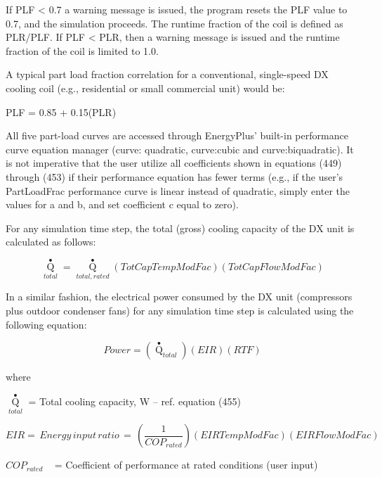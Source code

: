 If PLF \textless{} 0.7 a warning message is issued, the program resets the PLF value to 0.7, and the simulation proceeds. The runtime fraction of the coil is defined as PLR/PLF. If PLF \textless{} PLR, then a warning message is issued and the runtime fraction of the coil is limited to 1.0.

A typical part load fraction correlation for a conventional, single-speed DX cooling coil (e.g., residential or small commercial unit) would be:

PLF = 0.85 + 0.15(PLR)

All five part-load curves are accessed through EnergyPlus' built-in performance curve equation manager (curve: quadratic, curve:cubic and curve:biquadratic). It is not imperative that the user utilize all coefficients shown in equations (449) through (453) if their performance equation has fewer terms (e.g., if the user's PartLoadFrac performance curve is linear instead of quadratic, simply enter the values for a and b, and set coefficient c equal to zero).

For any simulation time step, the total (gross) cooling capacity of the DX unit is calculated as follows:

\begin{equation}
{\mathop Q\limits^ \bullet_{total}} = {\mathop Q\limits^ \bullet_{total,rated}}\left( {TotCapTempModFac} \right)\left( {TotCapFlowModFac} \right)
\end{equation}

In a similar fashion, the electrical power consumed by the DX unit (compressors plus outdoor condenser fans) for any simulation time step is calculated using the following equation:

\begin{equation}
Power = \left( {{{\mathop Q\limits^ \bullet  }_{total}}} \right)\left( {EIR} \right)\left( {RTF} \right)
\end{equation}

where

\({\mathop Q\limits^ \bullet_{total}}\) = Total cooling capacity, W -- ref. equation (455)

\begin{equation}
EIR = \,Energy\,input\,ratio\, = \,\left( {\frac{1}{{CO{P_{rated}}}}} \right)\left( {EIRTempModFac} \right)\left( {EIRFlowModFac} \right)
\end{equation}

\(CO{P_{rated}}\) ~ = Coefficient of performance at rated conditions (user input)

